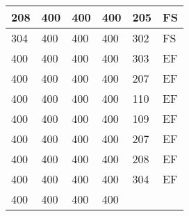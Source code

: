 \begin{table}[]
\begin{tabular}{lllll|l|}
208                                 & 400                                & 400                                & 400                                & 
205                                & FS                                    \\ \hline
304                                 & 400                                & 400                                & 400                                & 
302                                & FS                                    \\ \hline
400                                 & 400                                & 400                                & 400                                & 
303                                & EF                                    \\ \hline
400                                 & 400                                & 400                                & 400                                & 
207                                & EF                                    \\ \hline
400                                 & 400                                & 400                                & 400                                & 
110                                & EF                                    \\ \hline
400                                 & 400                                & 400                                & 400                                & 
109                                & EF                                    \\ \hline
400                                 & 400                                & 400                                & 400                                & 
207                                & EF                                    \\ \hline
400                                 & 400                                & 400                                & 400                                & 
208                                & EF                                    \\ \hline
400                                 & 400                                & 400                                & 400                                & 
304                                & EF                                    \\ \hline
400                                 & 400                                & 400                                & 400                                & 

\end{tabular}
\end{table}
